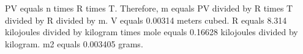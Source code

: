 PV equals n times R times T. Therefore, m equals PV divided by R times T divided by R divided by m.  
V equals 0.00314 meters cubed.  
R equals 8.314 kilojoules divided by kilogram times mole equals 0.16628 kilojoules divided by kilogram.  
m2 equals 0.003405 grams.
